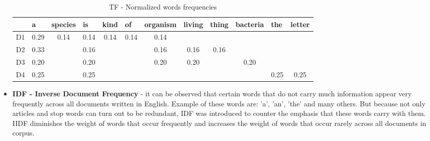 \begin{itemize}
\begin{table}[H]
	\centering
	\caption{TF - Normalized words frequencies}
	\label{tf_idf_tf_norm_freq}
	\begin{tabular}{@{}lccccccccccc@{}}
		\toprule
		& \multicolumn{1}{l}{a} & \multicolumn{1}{l}{species} & \multicolumn{1}{l}{is} & \multicolumn{1}{l}{kind} & \multicolumn{1}{l}{of} & \multicolumn{1}{l}{organism} & \multicolumn{1}{l}{living} & \multicolumn{1}{l}{thing} & \multicolumn{1}{l}{bacteria} & \multicolumn{1}{l}{the} & \multicolumn{1}{l}{letter} \\ \midrule
		D1 & 0.29                  & 0.14                        & 0.14                   & 0.14                     & 0.14                   & 0.14                         &                            &                           &                              &                         &                            \\
		D2 & 0.33                  &                             & 0.16                   &                          &                        & 0.16                         & 0.16                       & 0.16                      &                              &                         &                            \\
		D3 & 0.20                  &                             & 0.20                   &                          &                        & 0.20                         & 0.20                       &                           & 0.20                         &                         &                            \\
		D4 & 0.25                  &                             & 0.25                   &                          &                        &                              &                            &                           &                              & 0.25                    & 0.25                       \\ \bottomrule
	\end{tabular}
\end{table}
	
	\item \textbf{IDF - Inverse Document Frequency} - it can be observed that certain words that do not carry much information appear very frequently across all documents written in English. Example of these words are: 'a', 'an', 'the' and many others. But because not only articles and stop words can turn out to be redundant, IDF was introduced to counter the emphasis that these words carry with them. IIDF diminishes the weight of words that occur frequently and increases the weight of words that occur rarely across all documents in corpus.


\end{itemize}
